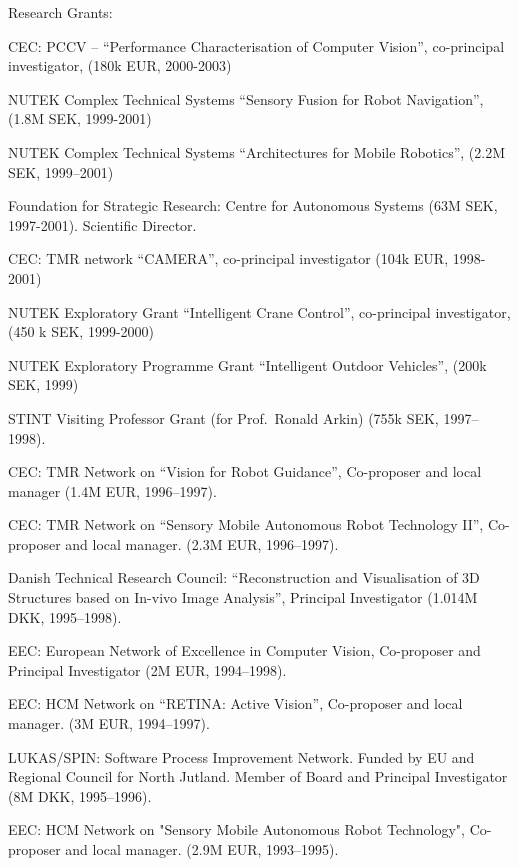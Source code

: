 \documentclass{article}
\begin{document}
\begin{cv}
\begin{cvlist}{Research Grants:}
\item CEC: PCCV -- ``Performance Characterisation of Computer
  Vision'',  co-principal investigator, (180k EUR, 2000-2003)%
\item NUTEK Complex Technical Systems ``Sensory Fusion for Robot
  Navigation'', (1.8M SEK, 1999-2001)%
\item NUTEK Complex Technical Systems ``Architectures for Mobile
  Robotics'', (2.2M SEK, 1999--2001)%
\item Foundation for Strategic Research: Centre for Autonomous Systems
  (63M SEK, 1997-2001). Scientific Director.%
\item CEC: TMR network ``CAMERA'', co-principal investigator  (104k
  EUR, 1998-2001)%
\item NUTEK Exploratory Grant ``Intelligent Crane Control'',
  co-principal investigator, (450 k SEK, 1999-2000)%
\item NUTEK Exploratory Programme Grant ``Intelligent Outdoor
  Vehicles'', (200k SEK, 1999)%
\item STINT Visiting Professor Grant (for Prof.\ Ronald Arkin)  (755k
  SEK, 1997--1998).%
\item CEC: TMR Network on ``Vision for Robot Guidance'', Co-proposer
  and local manager (1.4M EUR, 1996--1997).%
\item CEC: TMR Network on ``Sensory Mobile Autonomous Robot Technology
  II'', Co-proposer and local manager.  (2.3M EUR, 1996--1997).%
\item Danish Technical Research Council: ``Reconstruction and
  Visualisation of 3D Structures based on In-vivo Image Analysis'',
  Principal Investigator (1.014M DKK, 1995--1998).%
\item EEC: European Network of Excellence in Computer Vision,
  Co-proposer and Principal Investigator (2M EUR, 1994--1998).%
\item EEC: HCM Network on ``RETINA: Active Vision'', Co-proposer and
  local manager.  (3M EUR, 1994--1997).%
\item LUKAS/SPIN: Software Process Improvement Network. Funded by EU
  and Regional Council for North Jutland. Member of Board and
  Principal Investigator (8M DKK, 1995--1996).%
\item EEC: HCM Network on "Sensory Mobile Autonomous Robot
  Technology", Co-proposer and local manager.  (2.9M EUR,
  1993--1995).%

\end{cvlist}
\end{cv}
\end{document}
